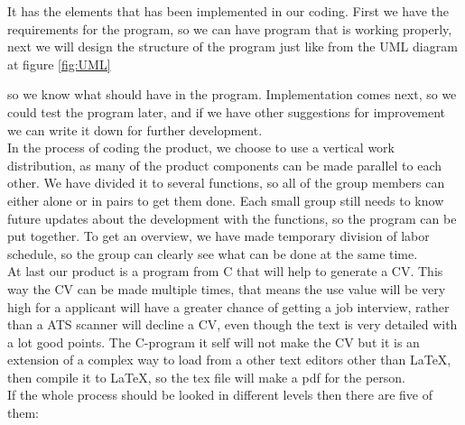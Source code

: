 It has the elements that has been implemented in our coding. First we have the requirements for the program, 
so we can have program that is working properly, 
next we will design the structure of the program just like from the UML diagram at figure \vref{fig:UML}
 
so we know what should have in the program. Implementation comes next, so we could test the program later, 
and if we have other suggestions for improvement we can write it down for further development.\\

In the process of coding the product, we choose to use a vertical work distribution, as many of the product
components can be made parallel to each other. We have divided it to several functions, 
so all of the group members can either alone or in pairs to get them done.
Each small group still needs to know future updates about the development with the functions, so the program can be put together.
To get an overview, we have made temporary division of labor
schedule, so the group can clearly see what can be done at the same time. \\

At last our product is a program from C that will help to generate a CV. This way the CV can be made multiple times,
that means the use value will be very high for a applicant will have a greater chance of getting a job interview,
rather than a ATS scanner will decline a CV, even though the text is very detailed with a lot good points.
The C-program it self will not make the CV but it is an extension of a complex way to load from a other text editors
other than LaTeX, then compile it to LaTeX, so the tex file will make a pdf for the person.\\

If the whole process should be looked in different levels then there are five of them:

